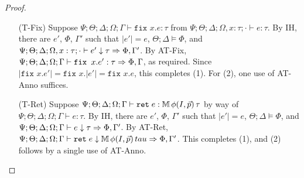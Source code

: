 \begin{proof}
\begin{itemize}
  
  \item[(T-Fix)] Suppose $\Psi ; \Theta ; \Delta ; \Omega ; \Gamma \vdash \texttt{fix } x.e : \tau$ from
  $\Psi ; \Theta ; \Delta ; \Omega, x : \tau ; \cdot \vdash e : \tau$.
  By IH, there are $e'$, $\Phi$, $\Gamma'$ such that
  $|e'| = e$,
  $\Theta ; \Delta \vDash \Phi$, and
  $\Psi ; \Theta ; \Delta ; \Omega, x : \tau ; \cdot \vdash e' \downarrow \tau \Rightarrow \Phi,\Gamma'$.
  By AT-Fix,
  $\Psi ; \Theta ; \Delta ; \Omega ; \Gamma \vdash \texttt{fix } x.e' : \tau \Rightarrow \Phi,\Gamma$,
  as required. Since $|\texttt{fix }x.e'| = \texttt{fix }x.|e'| = \texttt{fix }x.e$, this completes (1). For (2),
  one use of AT-Anno suffices.
  
  \item[(T-Ret)] Suppose
  $\Psi ; \Theta ; \Delta ; \Omega ; \Gamma \vdash \texttt{ret}\; e : \mathbb{M} \, \phi(I,\vec{p}) \, \tau$ by way of
  $\Psi ; \Theta ; \Delta ; \Omega ; \Gamma \vdash e : \tau$.
  By IH, there are $e'$, $\Phi$, $\Gamma'$ such that
  $|e'| = e$,
  $\Theta ; \Delta \vDash \Phi$, and
  $\Psi ; \Theta ; \Delta ; \Omega ; \Gamma \vdash e \downarrow \tau \Rightarrow \Phi,\Gamma'$.
  By AT-Ret,
  $\Psi ; \Theta ; \Delta ; \Omega ; \Gamma \vdash \texttt{ret}\; e \downarrow \mathbb{M} \, \phi(I,\vec{p}) \, tau \Rightarrow \Phi,\Gamma'$.
  This completes (1), and (2) follows by a single use of AT-Anno.
  

\end{itemize}
\end{proof}
